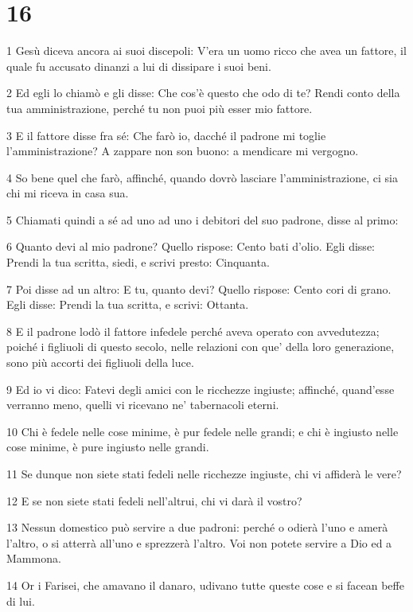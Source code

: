 \chapter{16}

\par 1 Gesù diceva ancora ai suoi discepoli: V'era un uomo ricco che avea un fattore, il quale fu accusato dinanzi a lui di dissipare i suoi beni.
\par 2 Ed egli lo chiamò e gli disse: Che cos'è questo che odo di te? Rendi conto della tua amministrazione, perché tu non puoi più esser mio fattore.
\par 3 E il fattore disse fra sé: Che farò io, dacché il padrone mi toglie l'amministrazione? A zappare non son buono: a mendicare mi vergogno.
\par 4 So bene quel che farò, affinché, quando dovrò lasciare l'amministrazione, ci sia chi mi riceva in casa sua.
\par 5 Chiamati quindi a sé ad uno ad uno i debitori del suo padrone, disse al primo:
\par 6 Quanto devi al mio padrone? Quello rispose: Cento bati d'olio. Egli disse: Prendi la tua scritta, siedi, e scrivi presto: Cinquanta.
\par 7 Poi disse ad un altro: E tu, quanto devi? Quello rispose: Cento cori di grano. Egli disse: Prendi la tua scritta, e scrivi: Ottanta.
\par 8 E il padrone lodò il fattore infedele perché aveva operato con avvedutezza; poiché i figliuoli di questo secolo, nelle relazioni con que' della loro generazione, sono più accorti dei figliuoli della luce.
\par 9 Ed io vi dico: Fatevi degli amici con le ricchezze ingiuste; affinché, quand'esse verranno meno, quelli vi ricevano ne' tabernacoli eterni.
\par 10 Chi è fedele nelle cose minime, è pur fedele nelle grandi; e chi è ingiusto nelle cose minime, è pure ingiusto nelle grandi.
\par 11 Se dunque non siete stati fedeli nelle ricchezze ingiuste, chi vi affiderà le vere?
\par 12 E se non siete stati fedeli nell'altrui, chi vi darà il vostro?
\par 13 Nessun domestico può servire a due padroni: perché o odierà l'uno e amerà l'altro, o si atterrà all'uno e sprezzerà l'altro. Voi non potete servire a Dio ed a Mammona.
\par 14 Or i Farisei, che amavano il danaro, udivano tutte queste cose e si facean beffe di lui.
